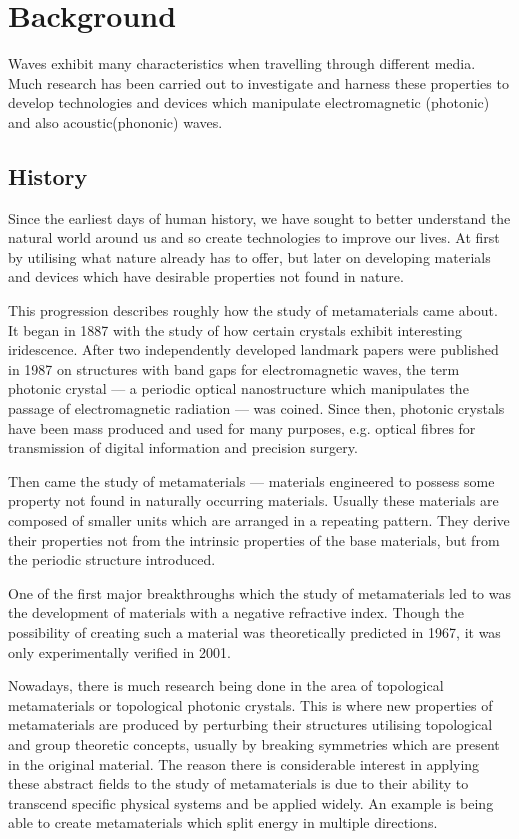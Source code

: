 \chapter{Background}
Waves exhibit many characteristics when travelling through different media.
Much research has been carried out to investigate and harness these properties
to develop technologies and devices which manipulate electromagnetic (photonic)
and also acoustic(phononic) waves.

\section{History}
Since the earliest days of human history, we have sought to better understand
the natural world around us and so create technologies to improve our lives. At
first by utilising what nature already has to offer, but later on developing
materials and devices which have desirable properties not found in nature.

This progression describes roughly how the study of metamaterials came about.
It began in 1887 with the study of how certain crystals exhibit interesting
iridescence.\cite{pcearliest} After two independently developed landmark papers
were published in 1987 on structures with band gaps for electromagnetic
waves,\cite{pceli,pcjohn} the term photonic crystal --- a periodic optical
nanostructure which manipulates the passage of electromagnetic radiation ---
was coined.\cite{pcfocus} Since then, photonic crystals have been mass produced
and used for many purposes, e.g. optical fibres for transmission of digital
information \cite{pcopfib} and precision surgery.\cite{pcsurgery,pcneuro}

Then came the study of metamaterials --- materials engineered to possess some
property not found in naturally occurring materials.\cite{briefintro} Usually
these materials are composed of smaller units which are arranged in a repeating
pattern. They derive their properties not from the intrinsic properties of the
base materials, but from the periodic structure introduced.

One of the first major breakthroughs which the study of metamaterials led to
was the development of materials with a negative refractive index. Though the
possibility of creating such a material was theoretically predicted in
1967,\cite{negrefrac} it was only experimentally verified in
2001.\cite{negrefracex}

Nowadays, there is much research being done in the area of topological
metamaterials or topological photonic
crystals.\cite{topoedge,toposplit,topomet} This is where new properties of
metamaterials are produced by perturbing their structures utilising topological
and group theoretic concepts, usually by breaking symmetries which are present
in the original material. The reason there is considerable interest in applying
these abstract fields to the study of metamaterials is due to their ability to
transcend specific physical systems and be applied widely. An example is being
able to create metamaterials which split energy in multiple
directions.\cite{toposplit} 

